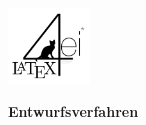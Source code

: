\documentclass[6pt,a4paper]{scrartcl}
\renewcommand{\emph}[1]{\textsf{\textbf{#1}}}
\begin{document}
\newpage
\begin{multicols}{3}

\parbox{2.3cm}{
	\includegraphics[height=2cm]{img/Logo.pdf}
}
\parbox{4cm}{
	\emph{\huge{Entwurfsverfahren}}
}

\setcounter{section}{0}			%


\end{multicols}
\end{document}
